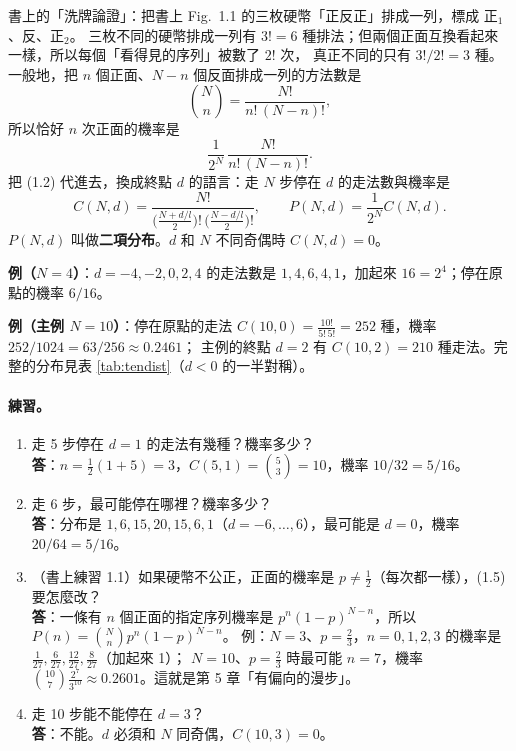 書上的「洗牌論證」：把書上 Fig.~1.1 的三枚硬幣「正反正」排成一列，標成 正$_1$、反、正$_2$。
三枚不同的硬幣排成一列有 $3!=6$ 種排法；但兩個正面互換看起來一樣，所以每個「看得見的序列」被數了 $2!$ 次，
真正不同的只有 $3!/2!=3$ 種。一般地，把 $n$ 個正面、$N-n$ 個反面排成一列的方法數是
\begin{equation}
\binom Nn=\frac{N!}{n!\,(N-n)!}, \tag{1.4}
\end{equation}
所以恰好 $n$ 次正面的機率是
\begin{equation}
\frac1{2^N}\,\frac{N!}{n!\,(N-n)!}. \tag{1.5}
\end{equation}
把 (1.2) 代進去，換成終點 $d$ 的語言：走 $N$ 步停在 $d$ 的走法數與機率是
\begin{equation}
C(N,d)=\frac{N!}{\big(\frac{N+d/l}{2}\big)!\,\big(\frac{N-d/l}{2}\big)!},\qquad
P(N,d)=\frac{1}{2^N}C(N,d). \tag{1.6--1.7}
\end{equation}
$P(N,d)$ 叫做\textbf{二項分布}。$d$ 和 $N$ 不同奇偶時 $C(N,d)=0$。

\textbf{例（$N=4$）}：$d=-4,-2,0,2,4$ 的走法數是 $1,4,6,4,1$，加起來 $16=2^4$；停在原點的機率 $6/16$。\par
\textbf{例（主例 $N=10$）}：停在原點的走法 $C(10,0)=\frac{10!}{5!\,5!}=252$ 種，機率 $252/1024=63/256\approx0.2461$；
主例的終點 $d=2$ 有 $C(10,2)=210$ 種走法。完整的分布見表 \ref{tab:tendist}（$d<0$ 的一半對稱）。

\begin{table}[H]
\centering
\small
\TabTenDist
\caption{$N=10$ 的終點分布（只列 $d\ge0$）。最後一列是 1.3 節的高斯近似（含奇偶性的因子 2）。}
\label{tab:tendist}
\end{table}

\paragraph{練習。}
\begin{enumerate}[label=(\alph*)]
\item 走 5 步停在 $d=1$ 的走法有幾種？機率多少？\\
  \textbf{答}：$n=\frac12(1+5)=3$，$C(5,1)=\binom53=10$，機率 $10/32=5/16$。
\item 走 6 步，最可能停在哪裡？機率多少？\\
  \textbf{答}：分布是 $1,6,15,20,15,6,1$（$d=-6,\dots,6$），最可能是 $d=0$，機率 $20/64=5/16$。
\item （書上練習 1.1）如果硬幣不公正，正面的機率是 $p\ne\tfrac12$（每次都一樣），(1.5) 要怎麼改？\\
  \textbf{答}：一條有 $n$ 個正面的指定序列機率是 $p^n(1-p)^{N-n}$，所以 $P(n)=\binom Nn p^n(1-p)^{N-n}$。
  例：$N=3$、$p=\tfrac23$，$n=0,1,2,3$ 的機率是 $\tfrac1{27},\tfrac6{27},\tfrac{12}{27},\tfrac8{27}$（加起來 1）；
  $N=10$、$p=\tfrac23$ 時最可能 $n=7$，機率 $\binom{10}{7}\frac{2^7}{3^{10}}\approx0.2601$。這就是第 5 章「有偏向的漫步」。
\item 走 10 步能不能停在 $d=3$？\\
  \textbf{答}：不能。$d$ 必須和 $N$ 同奇偶，$C(10,3)=0$。
\end{enumerate}


